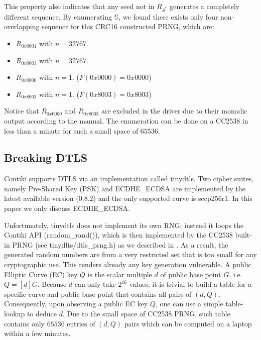 This property also indicates that any seed not in $R_{S^*}$ generates a completely different sequence. By enumerating $\mathbb{S}$, we found there exists only four non-overlapping sequence for this CRC16 constructed PRNG, which are:
\begin{itemize}
	\item $R_{0x0001}$ with $n = 32767$.
	\item $R_{0x0003}$ with $n = 32767$.
	\item $R_{0x0000}$ with $n = 1$. ($F(0x0000) = 0x0000$)
	\item $R_{0x8003}$ with $n = 1$. ($F(0x8003) = 0x8003$)
\end{itemize}
Notice that $R_{0x0000}$ and $R_{0x8003}$ are excluded in the driver due to their monadic output according to the manual\cite{CC2538Manual}. The enumeration can be done on a CC2538 in less than a minute for such a small space of $65536$.

\subsection{Breaking DTLS} \label{BreakDTLS}
Contiki supports DTLS via an implementation called tinydtls\cite{tinydtls082}.  Two cipher suites, namely Pre-Shared Key\cite{rfc4279} (PSK) and ECDHE\_ECDSA\cite{rfc4492} are implemented by the latest available version (0.8.2) and the only supported curve is secp256r1\cite{secp256r1}. In this paper we only discuss ECDHE\_ECDSA. 


Unfortunately, tinydtls does not implement its own RNG; instead it loops the Contiki  API (random\_rand()), which is then implemented by the CC2538 built-in PRNG (see tinydlts/dtls\_prng.h) as we described in . As a result, the generated random numbers are from a very restricted set that is too small for any cryptographic use. This renders already any key generation vulnerable. A public Elliptic Curve (EC) key $Q$ is the scalar multiple $d$ of public base point $G$, i.e. $Q=[d]G$. Because $d$ can only take $2^{16}$ values, it is trivial to build a table for a specific curve and public base point that contains all pairs of $(d,Q)$. Consequently, upon observing a public EC key $Q$, one can use a simple table-lookup to deduce $d$. Due to the small space of CC2538 PRNG, such table contains only  $65536$ entries of $(d,Q)$ pairs which can be computed on a laptop within a few minutes.

